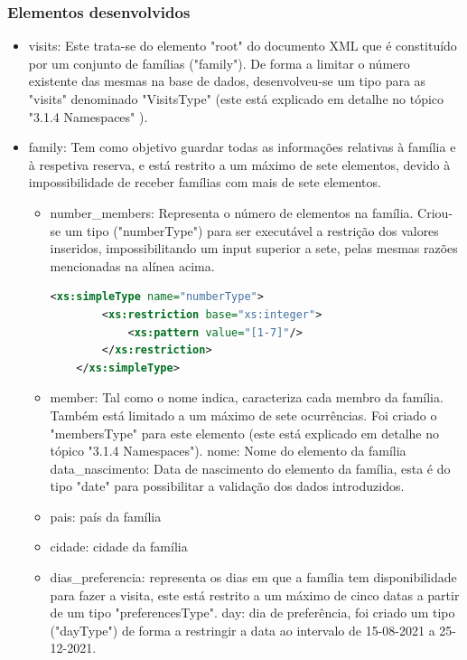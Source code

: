 \documentclass{article}
\begin{document}
\subsubsection{Elementos  desenvolvidos}
\begin{itemize}
    \item visits: Este trata-se do elemento "root" do documento XML que é constituído por um conjunto de famílias ("family"). De forma a limitar o número existente das mesmas na base de dados, desenvolveu-se um tipo para as "visits" denominado  "VisitsType" (este está explicado em detalhe no tópico "3.1.4 Namespaces" ).
    \item family: Tem como objetivo guardar todas as informações relativas à família e à respetiva reserva, e está restrito a um máximo de sete elementos, devido à impossibilidade de receber famílias com mais de sete elementos. 
    
     \begin{itemize}
         \item number\_members: Representa o número de elementos na família. Criou-se um tipo ("numberType") para ser executável a restrição dos valores inseridos, impossibilitando um input superior a sete,  pelas mesmas razões mencionadas na alínea acima.
         
\begin{lstlisting}[language=XML, caption=numberType]
<xs:simpleType name="numberType">
        <xs:restriction base="xs:integer">
            <xs:pattern value="[1-7]"/>
        </xs:restriction>
    </xs:simpleType>
\end{lstlisting}

         \item member: Tal como o nome indica, caracteriza cada membro da família. Também está  limitado a um máximo de sete ocurrências. Foi criado o "membersType" para este elemento (este está explicado em detalhe no tópico "3.1.4 Namespaces").  
              \subitem nome: Nome do elemento da família
              \subitem data\_nascimento: Data de nascimento do elemento da família, esta é do tipo "date" para possibilitar a validação dos dados introduzidos.
          \item pais: país da família
          \item cidade: cidade da família 
          \item dias\_preferencia: representa os dias em que a família tem disponibilidade para fazer a visita, este está restrito a um máximo de cinco datas a partir de um tipo "preferencesType". 
              \subitem day: dia de preferência, foi criado um tipo ("dayType") de forma a restringir a data ao intervalo de 15-08-2021 a 25-12-2021.


\end{itemize}
\end{itemize}
\end{document}
